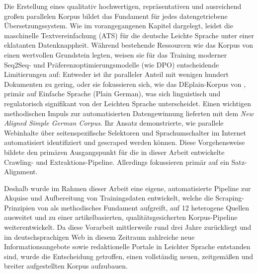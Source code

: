 Die Erstellung eines qualitativ hochwertigen, repräsentativen und ausreichend großen parallelen Korpus bildet das Fundament für jedes datengetriebene Übersetzungssystem. Wie im vorangegangenen Kapitel dargelegt, leidet die maschinelle Textvereinfachung (ATS) für die deutsche Leichte Sprache unter einer eklatanten Datenknappheit. Während bestehende Ressourcen wie das Korpus von \citet{battisti2020corpus} einen wertvollen Grundstein legten, weisen sie für das Training moderner Seq2Seq- und Präferenzoptimierungsmodelle (wie DPO) entscheidende Limitierungen auf: Entweder ist ihr paralleler Anteil mit wenigen hundert Dokumenten zu gering, oder sie fokussieren sich, wie das DEplain-Korpus von \citet{stodden2023deplain}, primär auf Einfache Sprache (Plain German), was sich linguistisch und regulatorisch signifikant von der Leichten Sprache unterscheidet. Einen wichtigen methodischen Impuls zur automatisierten Datengewinnung lieferten \citet{toborek2023new} mit dem \textit{New Aligned Simple German Corpus}. Ihr Ansatz demonstrierte, wie parallele Webinhalte über seitenspezifische Selektoren und Sprachumschalter im Internet automatisiert identifiziert und gescraped werden können. Diese Vorgehensweise bildete den primären Ausgangspunkt für die in dieser Arbeit entwickelte Crawling- und Extraktions-Pipeline. Allerdings fokussieren \citet{toborek2023new} primär auf ein Satz-Alignment.

Deshalb wurde im Rahmen dieser Arbeit eine eigene, automatisierte Pipeline zur Akquise und Aufbereitung von Trainingsdaten entwickelt, welche die Scraping-Prinzipien von \citet{toborek2023new} als methodisches Fundament aufgreift, auf 12 heterogene Quellen ausweitet und zu einer artikelbasierten, qualitätsgesicherten Korpus-Pipeline weiterentwickelt. Da diese Vorarbeit mittlerweile rund drei Jahre zurückliegt und im deutschsprachigen Web in diesem Zeitraum zahlreiche neue Informationsangebote sowie redaktionelle Portale in Leichter Sprache entstanden sind, wurde die Entscheidung getroffen, einen vollständig neuen, zeitgemäßen und breiter aufgestellten Korpus aufzubauen.

